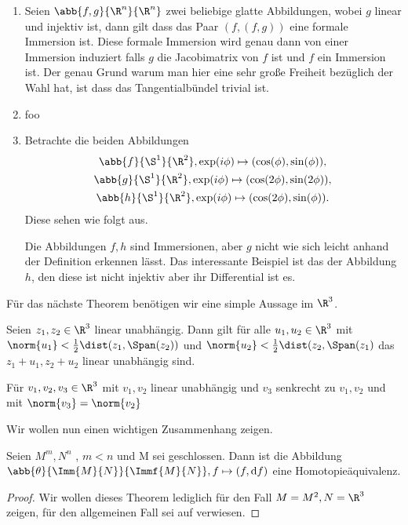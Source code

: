 \begin{Bsp}
	\begin{enumerate}[\textbullet]
	\item Seien $ \abb{f,g}{\R^n}{\R^n} $ zwei beliebige glatte
	Abbildungen, wobei $ g $ linear und injektiv ist, dann gilt dass das Paar $ (f,(f,g)) $ eine formale
	Immersion ist. Diese formale Immersion wird genau dann von
	einer Immersion induziert falls $ g $ die Jacobimatrix von $ f $
	ist und $ f $ ein Immersion ist. Der genau Grund warum man hier eine sehr große Freiheit bezüglich der Wahl hat, ist dass das Tangentialbündel trivial ist. 
	\item foo 
	
	\item Betrachte die beiden Abbildungen 
	\begin{gather*}\label{immBsp}
		\abb{f}{\S^1}{\R^2}, \exp(i\phi)%
		\mapsto (\cos(\phi),\sin(\phi)),\\
		\abb{g}{\S^1}{\R^2}, \exp(i\phi)%
		\mapsto (\cos(2\phi),\sin(2\phi)),\\
		\abb{h}{\S^1}{\R^2}, \exp(i\phi)%
		\mapsto (\cos(2\phi),\sin(\phi)).
	\end{gather*}
	Diese sehen wie folgt aus.\\
	
	Die Abbildungen $f,h$ sind Immersionen, aber $g$ nicht wie sich leicht
	anhand der Definition erkennen lässt. Das interessante Beispiel ist
	das der Abbildung $h$, den diese ist nicht injektiv aber ihr Differential
	ist es.
	\end{enumerate}
\end{Bsp}

Für das nächste Theorem benötigen wir eine simple Aussage im $ \R^3 $.
\begin{Lem}
	Seien $ z_1,z_2\in\R^3 $ linear unabhängig. Dann gilt für alle
	$ u_1,u_2\in\R^3 $ mit $ \norm{u_1} < \frac{1}{2}\dist(z_1,\Span(z_2)) $
	und $ \norm{u_2}<\frac{1}{2}\dist(z_2,\Span(z_1) $ das $ z_1+u_1,z_2+u_2 $
	linear unabhängig sind.
	
	Für $ v_1,v_2,v_3\in\R^3 $ mit $ v_1,v_2 $ linear unabhängig und
	$ v_3 $ senkrecht zu $ v_1,v_2 $ und mit $ \norm{v_3}=\norm{v_2} $
\end{Lem}

Wir wollen nun einen wichtigen Zusammenhang zeigen. 
\begin{Thm}\label{smalehirsch}
	Seien $M^m,N^n$ \mfgen, $m<n$ und M sei geschlossen. Dann ist die Abbildung
	$\abb{\theta}{\Imm{M}{N}}{\Immf{M}{N}}, f \mapsto (f,\mathrm{d} f)$ eine Homotopieäquivalenz.
	\begin{proof}
		Wir wollen dieses Theorem lediglich für den Fall $ M=M^2,N=\R^3 $
		zeigen, für den allgemeinen Fall sei auf \cite{SH} verwiesen.
		
	\end{proof}
	
\end{Thm}

